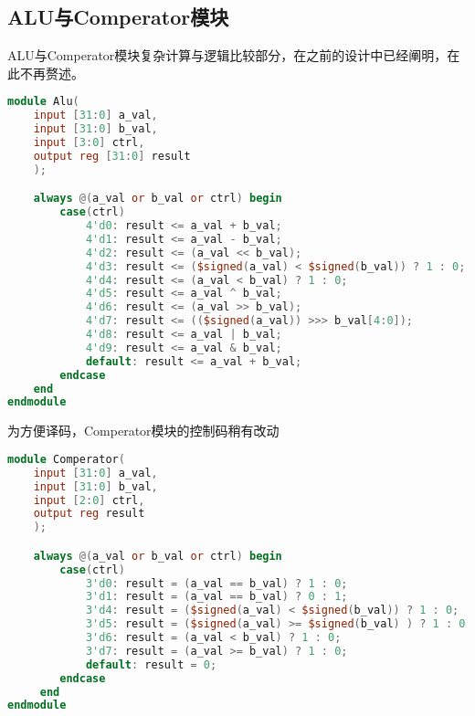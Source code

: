 \subsection{ALU与Comperator模块}
ALU与Comperator模块复杂计算与逻辑比较部分，在之前的设计中已经阐明，在此不再赘述。

\begin{lstlisting}[language = {verilog}]
module Alu(
    input [31:0] a_val,
    input [31:0] b_val,
    input [3:0] ctrl,
    output reg [31:0] result
    );

    always @(a_val or b_val or ctrl) begin
        case(ctrl)
            4'd0: result <= a_val + b_val;
            4'd1: result <= a_val - b_val;
            4'd2: result <= (a_val << b_val);                          //SLL
            4'd3: result <= ($signed(a_val) < $signed(b_val)) ? 1 : 0; //LT
            4'd4: result <= (a_val < b_val) ? 1 : 0;                   //LTU
            4'd5: result <= a_val ^ b_val;                             //XOR
            4'd6: result <= (a_val >> b_val);                          //SRL
            4'd7: result <= (($signed(a_val)) >>> b_val[4:0]);         //SRA
            4'd8: result <= a_val | b_val;                             //OR
            4'd9: result <= a_val & b_val;                             //AND
            default: result <= a_val + b_val;                          //ADD
        endcase
    end
endmodule
\end{lstlisting}
为方便译码，Comperator模块的控制码稍有改动
\begin{lstlisting}[language = {verilog}]
module Comperator(
    input [31:0] a_val,
    input [31:0] b_val,
    input [2:0] ctrl,
    output reg result
    );

    always @(a_val or b_val or ctrl) begin
        case(ctrl)
            3'd0: result = (a_val == b_val) ? 1 : 0;
            3'd1: result = (a_val == b_val) ? 0 : 1; 
            3'd4: result = ($signed(a_val) < $signed(b_val)) ? 1 : 0;
            3'd5: result = ($signed(a_val) >= $signed(b_val) ) ? 1 : 0;
            3'd6: result = (a_val < b_val) ? 1 : 0;
            3'd7: result = (a_val >= b_val) ? 1 : 0;
            default: result = 0;
        endcase
     end
endmodule
\end{lstlisting}

